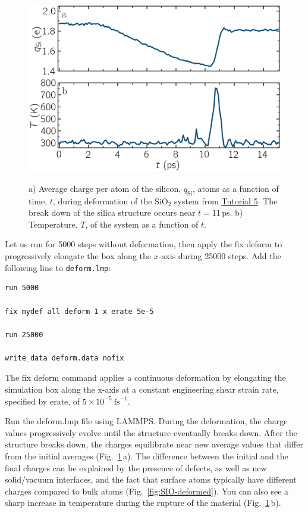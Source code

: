 \documentclass[9pt,tutorial]{livecoms}
\newcommand{\lmpcmd}[1]{\colorbox{listing}{\textcolor{command}{\small{#1}}}} %
\newcommand{\flecmd}[1]{\textcolor{command}{\texttt{#1}}} %
\begin{document}
\begin{figure}
\includegraphics[width=\linewidth]{SIO-deformed-charge}\\[-4ex]
\caption{a) Average charge per atom of the silicon, $q_\text{Si}$, atoms as
a function of time, $t$, during deformation of the $\text{SiO}_2$ system
from \hyperref[reactive-silicon-dioxide-label]{Tutorial 5}. The break down of the
silica structure occurs near $t = 11$\,ps.  b) Temperature, $T$, of the
system as a function of $t$.}
\label{fig:SIO-deformed-charge}
\end{figure}

Let us run for 5000 steps without deformation, then apply the \lmpcmd{fix deform}
to progressively elongate the box along the $x$-axis during 25000 steps.  Add
the following line to \flecmd{deform.lmp}:
\begin{lstlisting}
run 5000

fix mydef all deform 1 x erate 5e-5

run 25000

write_data deform.data nofix
\end{lstlisting}
The \lmpcmd{fix deform} command applies a continuous deformation
by elongating the simulation box along the x-axis at a constant engineering
shear strain rate, specified by \lmpcmd{erate}, of $5 \times 10^{-5}~\text{fs}^{-1}$.

Run the \lmpcmd{deform.lmp} file using LAMMPS.  During the deformation, the charge
values progressively evolve until the structure eventually breaks down.  After the
structure breaks down, the charges equilibrate near new average values that differ
from the initial averages (Fig.~\ref{fig:SIO-deformed-charge}\,a).  The difference
between the initial and the final charges can be explained by the presence of
defects, as well as new solid/vacuum interfaces, and the fact that surface atoms
typically have different charges compared to bulk atoms (Fig.~\ref{fig:SIO-deformed}).
You can also see a sharp increase in temperature during the rupture of
the material (Fig.~\ref{fig:SIO-deformed-charge}\,b).
\end{document}

